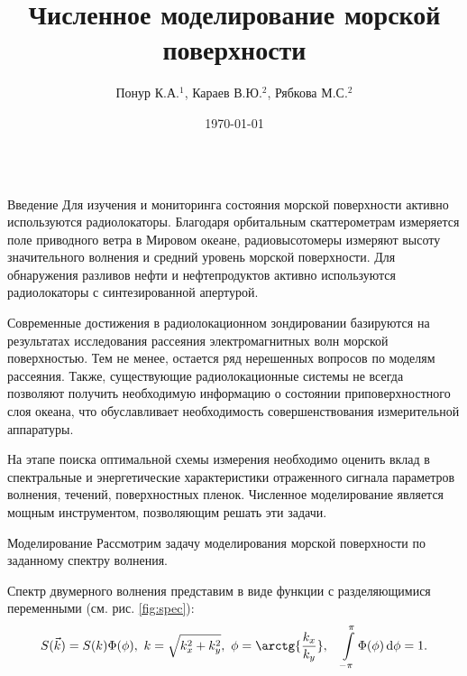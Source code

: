 
\title{Численное моделирование морской поверхности}
\author{Понур К.А.$^{1}$, Караев В.Ю.$^2$, Рябкова М.С.$^2$}
\date{\today}
\newcommand{\tK}{\widetilde{K}}
\usepackage{mathtools}
\newcommand{\mean}[1]{\langle #1 \rangle}

  \begin{frame}[t]{} 
    \begin{columns}[t]
      \begin{column}{.48\linewidth}
        \begin{block}{Введение}
            Для изучения и мониторинга состояния морской поверхности активно используются радиолокаторы. 
            Благодаря орбитальным скаттерометрам измеряется поле приводного ветра в Мировом океане, радиовысотомеры измеряют высоту значительного волнения и средний уровень
            морской поверхности. Для обнаружения разливов нефти и нефтепродуктов активно используются радиолокаторы с синтезированной апертурой.

            Современные достижения в радиолокационном зондировании базируются на результатах исследования рассеяния электромагнитных волн морской поверхностью. Тем не менее, остается ряд нерешенных 
            вопросов по моделям рассеяния. Также, существующие радиолокационные системы не всегда позволяют получить необходимую информацию о состоянии приповерхностного слоя океана, что обуславливает необходимость совершенствования измерительной аппаратуры. 

            На этапе поиска оптимальной схемы измерения необходимо оценить вклад в спектральные и энергетические характеристики отраженного сигнала параметров волнения, течений, поверхностных пленок. Численное моделирование является мощным инструментом, позволяющим решать эти задачи.
        \end{block}
        \begin{block}{Моделирование}
            Рассмотрим задачу моделирования морской поверхности по заданному спектру волнения.

            Спектр двумерного волнения представим в виде функции с разделяющимися переменными (см. рис. \ref{fig:spec}):
        \begin{equation}
            \label{eq:}
            S(\vec k) = S(k) \Phi(\phi), ~ k = \sqrt{k_x^2+k_y^2},~ \phi=\arctg{\frac{k_x}{k_y}},\quad \int\limits_{-\pi}^{\pi} \Phi(\phi) \dd{\phi} = 1.
        \end{equation}
        

\end{block}
\end{column}
\end{columns}
\end{frame}
